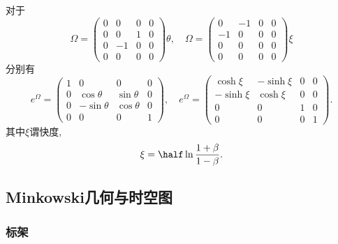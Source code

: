 \documentclass[hidelinks]{ctexart}
\begin{document}
\begin{ex}
    对于
    \[ \Omega = \begin{pmatrix}
        0 & 0 & 0 & 0 \\
        0 & 0 & 1 & 0 \\
        0 & -1 & 0 & 0 \\
        0 & 0 & 0 & 0
    \end{pmatrix}\theta,\quad \Omega = \begin{pmatrix}
        0 & -1 & 0 & 0 \\
        -1 & 0 & 0 & 0 \\
        0 & 0 & 0 & 0 \\
        0 & 0 & 0 & 0
    \end{pmatrix}\xi \]
    分别有
    \[ e^\Omega = \begin{pmatrix}
        1 & 0 & 0 & 0 \\
        0 & \cos\theta & \sin\theta & 0 \\
        0 & -\sin\theta & \cos\theta & 0 \\
        0 & 0 & 0 & 1
    \end{pmatrix},\quad e^\Omega = \begin{pmatrix}
        \cosh \xi & -\sinh \xi & 0 & 0 \\
        -\sinh \xi & \cosh \xi & 0 & 0 \\
        0 & 0 & 1 & 0 \\
        0 & 0 & 0 & 1
    \end{pmatrix}. \]
    其中$\xi$谓快度,
    \[ \xi = \half \ln \frac{1+\beta}{1-\beta}. \]
\end{ex}



\subsection{Minkowski几何与时空图} %
\label{sub:minkowski几何与时空图}

\subsubsection{标架} %
\label{ssub:标架}
\end{document}
